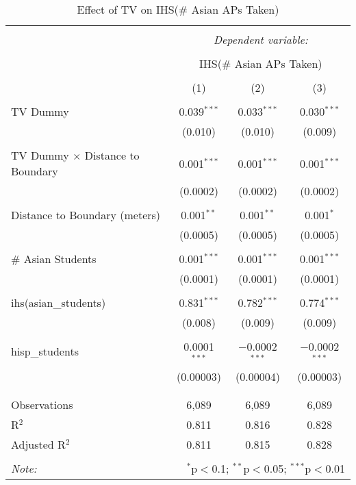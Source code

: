 
\begin{table}[!htbp] \centering 
  \caption{Effect of TV on IHS(\# Asian APs Taken)} 
  \label{} 
\begin{tabular}{@{\extracolsep{-2pt}}lccc} 
\\[-1.8ex]\hline 
\hline \\[-1.8ex] 
 & \multicolumn{3}{c}{\textit{Dependent variable:}} \\ 
\cline{2-4} 
\\[-1.8ex] & \multicolumn{3}{c}{IHS(\# Asian APs Taken)} \\ 
\\[-1.8ex] & (1) & (2) & (3)\\ 
\hline \\[-1.8ex] 
 TV Dummy & 0.039$^{***}$ & 0.033$^{***}$ & 0.030$^{***}$ \\ 
  & (0.010) & (0.010) & (0.009) \\ 
  & & & \\ 
 TV Dummy $\times$ Distance to Boundary & 0.001$^{***}$ & 0.001$^{***}$ & 0.001$^{***}$ \\ 
  & (0.0002) & (0.0002) & (0.0002) \\ 
  & & & \\ 
 Distance to Boundary (meters) & 0.001$^{**}$ & 0.001$^{**}$ & 0.001$^{*}$ \\ 
  & (0.0005) & (0.0005) & (0.0005) \\ 
  & & & \\ 
 \# Asian Students & 0.001$^{***}$ & 0.001$^{***}$ & 0.001$^{***}$ \\ 
  & (0.0001) & (0.0001) & (0.0001) \\ 
  & & & \\ 
 ihs(asian\_students) & 0.831$^{***}$ & 0.782$^{***}$ & 0.774$^{***}$ \\ 
  & (0.008) & (0.009) & (0.009) \\ 
  & & & \\ 
 hisp\_students & 0.0001$^{***}$ & $-$0.0002$^{***}$ & $-$0.0002$^{***}$ \\ 
  & (0.00003) & (0.00004) & (0.00003) \\ 
  & & & \\ 
\hline \\[-1.8ex] 
Observations & 6,089 & 6,089 & 6,089 \\ 
R$^{2}$ & 0.811 & 0.816 & 0.828 \\ 
Adjusted R$^{2}$ & 0.811 & 0.815 & 0.828 \\ 
\hline 
\hline \\[-1.8ex] 
\textit{Note:}  & \multicolumn{3}{r}{$^{*}$p$<$0.1; $^{**}$p$<$0.05; $^{***}$p$<$0.01} \\ 
\end{tabular} 
\end{table} 
